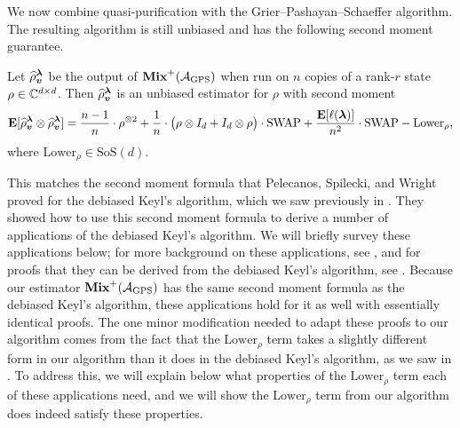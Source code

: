 \documentclass{article}
\newcommand{\mixed}{\textup{\textbf{Mix}}}
\newcommand{\gps}{\calA_{\mathrm{GPS}}}
\newcommand{\symsep}{\mathrm{SoS}}
\newcommand{\swap}{\mathrm{SWAP}}
\begin{document}
We now combine quasi-purification with the Grier--Pashayan--Schaeffer algorithm.
The resulting algorithm is still unbiased and has the following second moment guarantee.

\begin{theorem} \label{thm:gps-moments-tight}
    Let $\widehat{\rho}_{\boldsymbol{v}}^{\boldsymbol{\lambda}}$ be the output of $\mixed^+(\gps)$ when run on $n$ copies of a rank-$r$ state $\rho \in \mathbb C^{d \times d}$.
    Then $\widehat{\rho}_{\boldsymbol{v}}^{\boldsymbol{\lambda}}$ is an unbiased estimator for $\rho$ with second moment
    \begin{equation*}
    \E[\widehat{\rho}_{\bv}^{\blambda}\otimes \widehat{\rho}_{\bv}^{\blambda}] = \frac{n-1}{n} \cdot \rho^{\otimes 2} + \frac{1}{n} \cdot \big(\rho \otimes I_d + I_d \otimes \rho\big) \cdot \swap + \frac{\E[\ell(\blambda)]}{n^2} \cdot \swap-\mathrm{Lower}_{\rho},
    \end{equation*}
    where $\mathrm{Lower}_{\rho} \in \symsep(d)$.
\end{theorem}

This matches the second moment formula that Pelecanos, Spilecki, and Wright proved for the debiased Keyl's algorithm, which we saw previously in .
They showed how to use this second moment formula to derive a number of applications of the debiased Keyl's algorithm.
We will briefly survey these applications below;
for more background on these applications, see \cite[Section 1]{PSW25},
and for proofs that they can be derived from the debiased Keyl's algorithm, see \cite[Part II]{PSW25}.
Because our estimator $\mixed^+(\gps)$ has the same second moment formula as the debiased Keyl's algorithm, these applications hold for it as well with essentially identical proofs.
The one minor modification needed to adapt these proofs to our algorithm comes from the fact that the $\mathrm{Lower}_{\rho}$ term takes a slightly different form in our algorithm than it does in the debiased Keyl's algorithm, as we saw in .
To address this, we will explain below what properties of the $\mathrm{Lower}_{\rho}$ term each of these applications need, and we will show the $\mathrm{Lower}_{\rho}$ term from our algorithm does indeed satisfy these properties.
\end{document}
